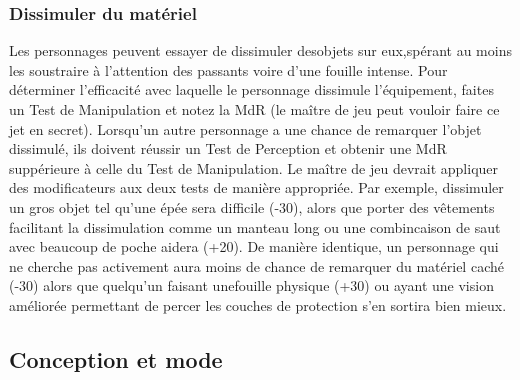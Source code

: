 \subsubsection{Dissimuler du matériel} 

Les personnages peuvent essayer de dissimuler desobjets sur eux,spérant au moins les soustraire à l'attention des passants voire d'une fouille intense. Pour déterminer l'efficacité avec laquelle le personnage dissimule l'équipement, faites un Test de Manipulation et notez la MdR (le maître de jeu peut vouloir faire ce jet en secret). Lorsqu'un autre personnage a une chance de remarquer l'objet dissimulé, ils doivent réussir un Test de Perception et obtenir une MdR suppérieure à celle du Test de Manipulation. Le maître de jeu devrait appliquer des modificateurs aux deux tests de manière appropriée. Par exemple, dissimuler un gros objet tel qu'une épée sera difficile (-30), alors que porter des vêtements facilitant la dissimulation comme un manteau long ou une combincaison de saut avec beaucoup de poche aidera (+20). De manière identique, un personnage qui ne cherche pas activement  aura moins de chance de remarquer du matériel caché (-30) alors que quelqu'un faisant unefouille physique (+30) ou ayant une vision améliorée permettant de percer les couches de protection s'en sortira bien mieux. 



\subsection{Conception et mode} \label{sec:design-fashion} 

